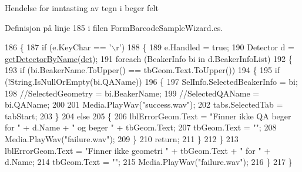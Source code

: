 Hendelse for inntasting av tegn i beger felt 

Definisjon på linje 185 i filen Form\+Barcode\+Sample\+Wizard.\+cs.


\begin{DoxyCode}
186         \{
187             \textcolor{keywordflow}{if} (e.KeyChar == \textcolor{charliteral}{'\(\backslash\)r'})
188             \{
189                 e.Handled = \textcolor{keyword}{true};
190                 Detector d = \hyperlink{class_scintilab_1_1_form_barcode_sample_wizard_ad7e7a4f0718e414a0a11cd67c1066e3f}{getDetectorByName}(\hyperlink{class_scintilab_1_1_form_barcode_sample_wizard_a7b70de65be45e93c95b176887be00dd0}{det});
191                 \textcolor{keywordflow}{foreach} (BeakerInfo bi \textcolor{keywordflow}{in} d.BeakerInfoList)
192                 \{
193                     \textcolor{keywordflow}{if} (bi.BeakerName.ToUpper() == tbGeom.Text.ToUpper())
194                     \{
195                         \textcolor{keywordflow}{if} (!String.IsNullOrEmpty(bi.QAName))
196                         \{
197                             SelInfo.SelectedBeakerInfo = bi;
198                             \textcolor{comment}{//SelectedGeometry = bi.BeakerName;}
199                             \textcolor{comment}{//SelectedQAName = bi.QAName;}
200 
201                             Media.PlayWav(\textcolor{stringliteral}{"success.wav"});
202                             tabs.SelectedTab = tabStart;
203                         \}
204                         \textcolor{keywordflow}{else}
205                         \{
206                             lblErrorGeom.Text = \textcolor{stringliteral}{"Finner ikke QA beger for "} + d.Name + \textcolor{stringliteral}{" og beger "} + 
      tbGeom.Text;
207                             tbGeom.Text = \textcolor{stringliteral}{""};
208                             Media.PlayWav(\textcolor{stringliteral}{"failure.wav"});
209                         \}
210                         \textcolor{keywordflow}{return};
211                     \}
212                 \}
213                 lblErrorGeom.Text = \textcolor{stringliteral}{"Finner ikke geometri "} + tbGeom.Text + \textcolor{stringliteral}{" for "} + d.Name;
214                 tbGeom.Text = \textcolor{stringliteral}{""};
215                 Media.PlayWav(\textcolor{stringliteral}{"failure.wav"});
216             \}
217         \}
\end{DoxyCode}
